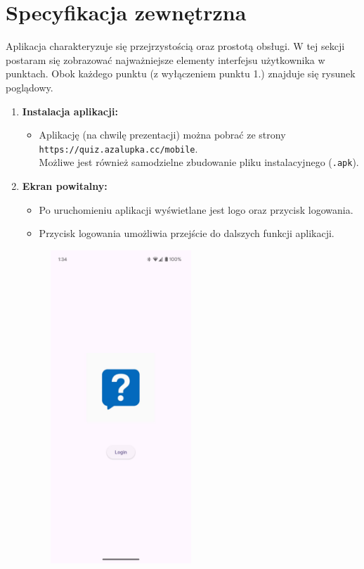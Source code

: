 \documentclass{article}
\begin{document}
\section{Specyfikacja zewnętrzna}
Aplikacja charakteryzuje się przejrzystością oraz prostotą obsługi. W tej sekcji postaram się zobrazować najważniejsze elementy interfejsu użytkownika w punktach. Obok każdego punktu (z wyłączeniem punktu 1.) znajduje się rysunek poglądowy.
\begin{enumerate}
\item \textbf{Instalacja aplikacji:} \\
\begin{itemize}
	\item Aplikację (na chwilę prezentacji) można pobrać ze strony \\ \texttt{https://quiz.azalupka.cc/mobile}. \\ Możliwe jest również samodzielne zbudowanie pliku instalacyjnego (\texttt{.apk}).
\end{itemize}
\item \textbf{Ekran powitalny:} \\
	\begin{minipage}{0.5\textwidth}
		\begin{itemize}
			\item Po uruchomieniu aplikacji wyświetlane jest logo oraz przycisk logowania.
			\item Przycisk logowania umożliwia przejście do dalszych funkcji aplikacji.
		\end{itemize}
	\end{minipage}
	\begin{minipage}{0.5\textwidth}
		\begin{figure}[H]
			\centering
			\includegraphics[width=0.5\textwidth]{../_assets/mobile/welcome.jpeg}

\end{figure}
\end{minipage}
\end{enumerate}
\end{document}
